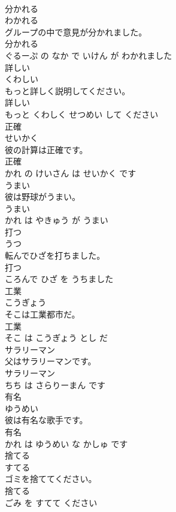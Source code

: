 \documentclass[8pt]{extreport}
\begin{document}
\begin{CJK}{UTF8}{min}
\\	分かれる	
\\	わかれる			
\\	グループの中で意見が分かれました。	
\\	分かれる 
\\	ぐるーぷ の なか で いけん が わかれました			
\\	詳しい	
\\	くわしい			
\\	もっと詳しく説明してください。	
\\	詳しい 
\\	もっと くわしく せつめい して ください			
\\	正確	
\\	せいかく			
\\	彼の計算は正確です。	
\\	正確 
\\	かれ の けいさん は せいかく です			
\\	うまい	
\\	彼は野球がうまい。	
\\	うまい 
\\	かれ は やきゅう が うまい			
\\	打つ	
\\	うつ			
\\	転んでひざを打ちました。	
\\	打つ 
\\	ころんで ひざ を うちました			
\\	工業	
\\	こうぎょう			
\\	そこは工業都市だ。	
\\	工業 
\\	そこ は こうぎょう とし だ			
\\	サラリーマン	
\\	父はサラリーマンです。	
\\	サラリーマン 
\\	ちち は さらりーまん です			
\\	有名	
\\	ゆうめい			
\\	彼は有名な歌手です。	
\\	有名 
\\	かれ は ゆうめい な かしゅ です			
\\	捨てる	
\\	すてる			
\\	ゴミを捨ててください。	
\\	捨てる 
\\	ごみ を すてて ください			

\end{CJK}
\end{document}
